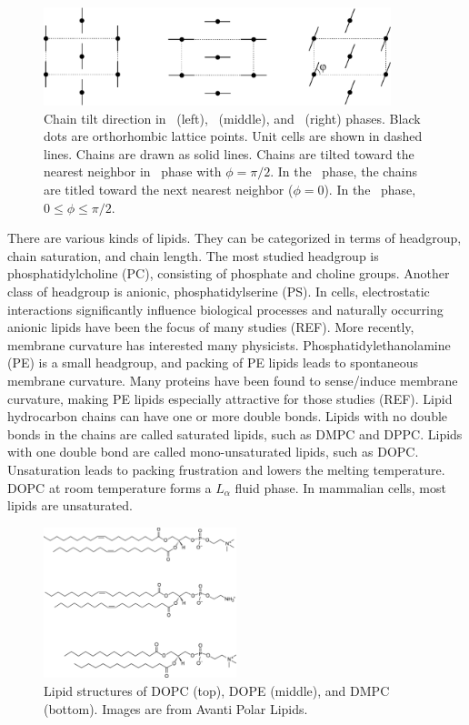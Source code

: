 \begin{figure}[htbp]
  \centering
  \includegraphics[width=0.9\textwidth]{figures/gel_phase_packing}
  \caption{Chain tilt direction in \LbetaI\ (left), \LbetaF\ (middle), and
  \LbetaL\ (right) phases. Black dots are orthorhombic lattice points.
  Unit cells are shown in dashed lines.
  Chains are drawn as solid lines. Chains are tilted toward the
  nearest neighbor in \LbetaI\ phase with $\phi=\pi/2$. 
  In the \LbetaF\ phase, the chains are titled toward the next nearest neighbor
  ($\phi=0$). In the \LbetaL\ phase, $0 \leq \phi \leq \pi/2$.}
  \label{fig:gel_phase_packing}
\end{figure}

There are various kinds of lipids. They can be 
categorized in terms of headgroup, chain saturation, and chain length.
The most studied headgroup is phosphatidylcholine (PC),
consisting of phosphate and choline groups. Another class of headgroup is
anionic, phosphatidylserine (PS). In cells, electrostatic interactions
significantly influence biological processes and naturally occurring anionic
lipids have been the focus of many studies (REF). More recently, membrane curvature
has interested many physicists. Phosphatidylethanolamine (PE) is a small 
headgroup, and packing of PE lipids leads to spontaneous membrane curvature.
Many proteins have been found to sense/induce membrane curvature, 
making PE lipids especially attractive for those studies (REF).
Lipid hydrocarbon chains can have one or more double bonds. Lipids
with no double bonds in the chains are called saturated lipids,
such as DMPC and DPPC. 
Lipids with one double bond
are called mono-unsaturated lipids, such as DOPC.
Unsaturation leads to packing frustration and lowers the melting 
temperature. DOPC at room temperature forms a $L_{\alpha}$ fluid phase.
In mammalian cells, most lipids are unsaturated.

\begin{figure}[htbp]
  \centering
  \includegraphics[width=0.5\textwidth]{figures/lipid_structure}
  \caption{Lipid structures of DOPC (top), DOPE (middle),
  and DMPC (bottom). Images are from Avanti Polar Lipids.}
  \label{fig:lipid_structure}
\end{figure}

